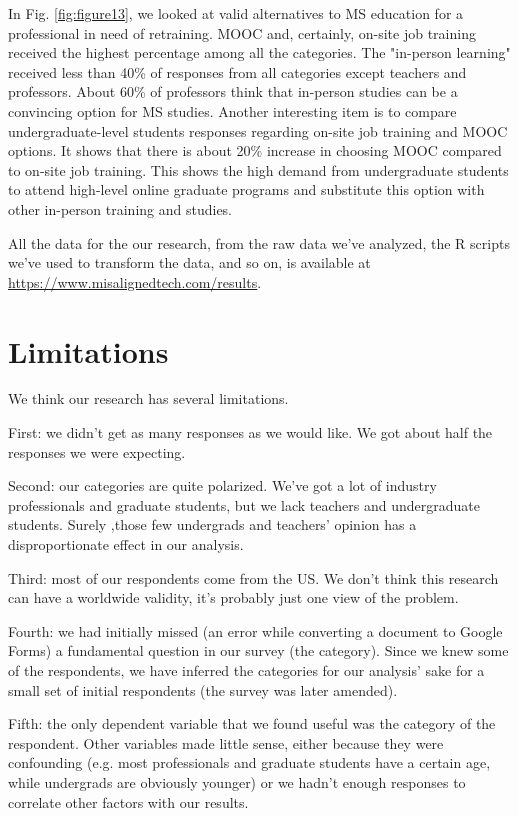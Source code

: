 \documentclass{sigchi}
\begin{document}
In Fig. \ref{fig:figure13}, we looked at valid alternatives to MS education for a professional in need of retraining. MOOC and, certainly, on-site job training received the highest percentage among all the categories. The "in-person learning" received less than 40\% of responses from all categories except teachers and professors. About 60\% of professors think that in-person studies can be a convincing option for MS studies. Another interesting item is to compare undergraduate-level students responses regarding on-site job training and MOOC options. It shows that there is about 20\% increase in choosing MOOC compared to on-site job training. This shows the high demand from undergraduate students to attend high-level online graduate programs and substitute this option with other in-person training and studies.

All the data for the our research, from the raw data we've analyzed, the R scripts we've used to transform the data, and so on, is available at \url{https://www.misalignedtech.com/results}.

\section{Limitations}
 We think our research has several limitations.

First: we didn't get as many responses as we would like. We got about half the responses we were expecting.

Second: our categories are quite polarized. We've got a lot of industry professionals and graduate students, but we lack teachers and undergraduate students. Surely ,those few undergrads and teachers' opinion has a disproportionate effect in our analysis.

Third: most of our respondents come from the US. We don't think this research can have a worldwide validity, it's probably just one view of the problem.

Fourth: we had initially missed (an error while converting a document to Google Forms) a fundamental question in our survey (the category). Since we knew some of the respondents, we have inferred the categories for our analysis' sake for a small set of initial respondents (the survey was later amended).

Fifth: the only dependent variable that we found useful was the category of the respondent. Other variables made little sense, either because they were confounding (e.g. most professionals and graduate students have a certain age, while undergrads are obviously younger) or we hadn't enough responses to correlate other factors with our results.
\end{document}
